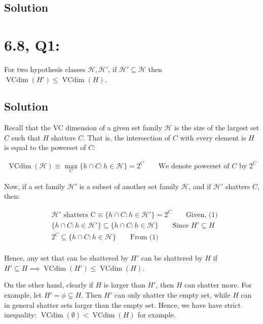 \documentclass[11pt]{article}
\renewcommand{\H}{\ensuremath{\mathcal{H}}}
\DeclareMathOperator{\vcdim}{VCdim}
\newcommand{\Vcdim}{\ensuremath{\vcdim}}
\begin{document}
\subsection*{Solution}

\section*{6.8, Q1:} For two hypothesis classes $\H, \H'$, if $\H' \subseteq \H$
then $\vcdim(H') \leq \vcdim(H)$.
\subsection*{Solution}
Recall that the VC dimension of a given set family $\H$ is the size of
the largest set $C$ such that $H$ shatters $C$. That is, the intersection of $C$
with every element is $H$ is equal to the powerset of $C$:

\begin{align*}
\Vcdim(\H) \equiv \max_{C} \{ h \cap C : h \in \H \} = 2^C \qquad \text{We denote powerset of $C$ by $2^C$ }
\end{align*}

Now, if a set family $\H'$ is a subset of another set family $\H$, and if $\H'$
shatters $C$, then:

\begin{align*}
    &\H' \text{ shatters C} \equiv  \{ h \cap C : h \in \H'\} = 2^C \qquad \text{Given, (1)}\\
    &\{ h \cap C : h \in \H' \} \subseteq \{ h \cap C : h \in \H \} \qquad \text{Since $H' \subseteq H$} \\
    &2^C \subseteq \{ h \cap C : h \in \H \}  \qquad \text{From (1)} \\
\end{align*}

Hence, any set that can be shattered by $H'$ can be shattered by $H$ if
$H' \subseteq H \implies \vcdim(H') \leq \vcdim(H)$.

On the other hand, clearly if $H$ is larger than $H'$, then $H$ can shatter more.
For example, let $H' = \phi \subsetneq H$. Then $H'$ can only shatter the empty
set, while $H$ can in general shatter sets larger than the empty set. Hence,
we have have strict inequality: $\vcdim(\emptyset) < \vcdim(H)$ for example.
\end{document}
